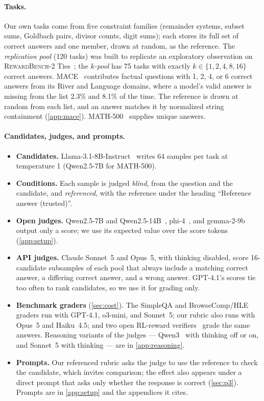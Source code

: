 \documentclass{article}
\begin{document}
\paragraph{Tasks.}
Our own tasks come from five constraint families (remainder systems, subset sums, Goldbach pairs, divisor counts, digit sums); each stores its full set of correct answers and one member, drawn at random, as the reference.
The \emph{replication pool} (120 tasks) was built to replicate an exploratory observation on \textsc{RewardBench-2} Ties~\citep{malik2025rewardbench2}; the \emph{$k$-pool} has 75 tasks with exactly $k \in \{1,2,4,8,16\}$ correct answers.
\textsc{MACE}~\citep{mace2026} contributes factual questions with 1, 2, 4, or 6 correct answers from its River and Language domains, where a model's valid answer is missing from the list 2.3\% and 8.1\% of the time.
The reference is drawn at random from each list, and an answer matches it by normalized string containment (\cref{app:mace}).
MATH-500~\citep{hendrycks2021math} supplies unique answers.

\paragraph{Candidates, judges, and prompts.}
\begin{itemize}[leftmargin=1.2em,itemsep=1pt,topsep=2pt]
\item \textbf{Candidates.} Llama-3.1-8B-Instruct~\citep{grattafiori2024llama3} writes 64 samples per task at temperature 1 (Qwen2.5-7B for MATH-500).
\item \textbf{Conditions.} Each sample is judged \emph{blind}, from the question and the candidate, and \emph{referenced}, with the reference under the heading ``Reference answer (trusted)''.
\item \textbf{Open judges.} Qwen2.5-7B and Qwen2.5-14B~\citep{yang2024qwen25}, phi-4~\citep{abdin2024phi4}, and gemma-2-9b~\citep{riviere2024gemma2} output only a score; we use its expected value over the score tokens (\cref{app:setup}).
\item \textbf{API judges.} Claude Sonnet~5 and Opus~5, with thinking disabled, score 16-candidate subsamples of each pool that always include a matching correct answer, a differing correct answer, and a wrong answer. GPT-4.1's scores tie too often to rank candidates, so we use it for grading only.
\item \textbf{Benchmark graders} (\cref{sec:cost}). The SimpleQA and BrowseComp/HLE graders run with GPT-4.1, o3-mini, and Sonnet~5; our rubric also runs with Opus~5 and Haiku~4.5; and two open RL-reward verifiers~\citep{ma2025generalreasoner,liu2025compassverifier} grade the same answers. Reasoning variants of the judges --- Qwen3~\citep{yang2025qwen3} with thinking off or on, and Sonnet~5 with thinking --- are in \cref{app:reasoning}.
\item \textbf{Prompts.} Our referenced rubric asks the judge to use the reference to check the candidate, which invites comparison; the effect also appears under a direct prompt that asks only whether the response is correct (\cref{sec:p3}). Prompts are in \cref{app:setup} and the appendices it cites.
\end{itemize}
\end{document}

